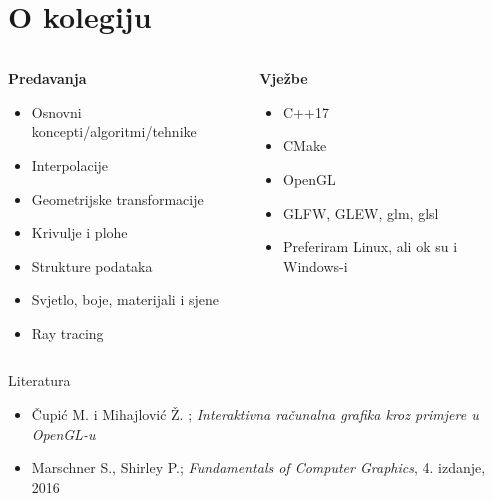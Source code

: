 \documentclass[9pt]{beamer}
\begin{document}
\section{O kolegiju}
\begin{frame}
	\begin{columns}[t]
		
		
		\begin{column}{0.4 \textwidth}
			\textbf{Predavanja}
				\begin{itemize}
				\item Osnovni koncepti/algoritmi/tehnike
				\item Interpolacije
				\item Geometrijske transformacije
				\item Krivulje i plohe
				\item Strukture podataka
				\item Svjetlo, boje, materijali i sjene
				\item Ray tracing
			\end{itemize}
		\end{column}

		
		\begin{column}{0.4 \textwidth}
			\textbf{Vježbe}
		\begin{itemize}
			\item C++17
			\item CMake
			\item OpenGL
			\item GLFW, GLEW, glm, glsl
			\item Preferiram Linux, ali ok su i Windows-i
		\end{itemize}
	\end{column}
	\end{columns}
\end{frame}

\begin{frame}{Literatura}
	\begin{itemize}
		\item Čupić M. i Mihajlović Ž. ; \textit{Interaktivna računalna grafika kroz primjere u OpenGL-u}
		\item Marschner S., Shirley P.; \textit{Fundamentals of Computer Graphics}, 4. izdanje, 2016
	\end{itemize}
\end{frame}
\end{document}

